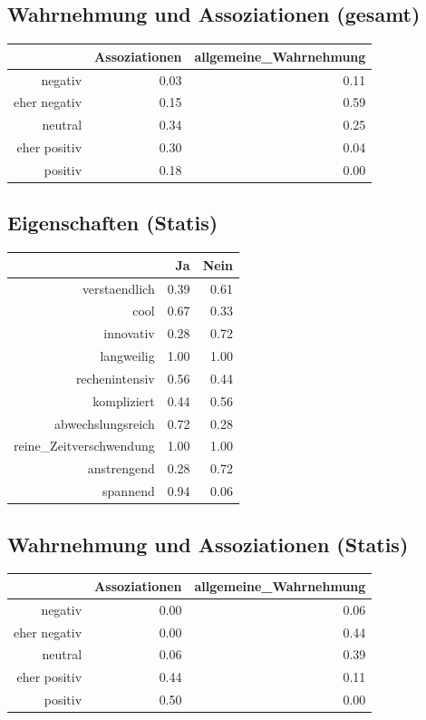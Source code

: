 \documentclass[12pt,a4paper,titlepage=true,parskip,ngerman]{scrartcl}
\begin{document}
\subsection{Wahrnehmung und Assoziationen (gesamt)}
\begin{table}[ht]
\begin{tabular}{rrr}
  \hline
 & Assoziationen & allgemeine\_Wahrnehmung \\ 
  \hline
negativ & 0.03 & 0.11 \\ 
  eher negativ & 0.15 & 0.59 \\ 
  neutral & 0.34 & 0.25 \\ 
  eher positiv & 0.30 & 0.04 \\ 
  positiv & 0.18 & 0.00 \\ 
   \hline
\end{tabular}
\end{table}
\newpage

\subsection{Eigenschaften (Statis)}
\begin{table}[ht]
\begin{tabular}{rrr}
  \hline
 & Ja & Nein \\ 
  \hline
verstaendlich & 0.39 & 0.61 \\ 
  cool & 0.67 & 0.33 \\ 
  innovativ & 0.28 & 0.72 \\ 
  langweilig & 1.00 & 1.00 \\ 
  rechenintensiv & 0.56 & 0.44 \\ 
  kompliziert & 0.44 & 0.56 \\ 
  abwechslungsreich & 0.72 & 0.28 \\ 
  reine\_Zeitverschwendung & 1.00 & 1.00 \\ 
  anstrengend & 0.28 & 0.72 \\ 
  spannend & 0.94 & 0.06 \\ 
   \hline
\end{tabular}
\end{table}

\subsection{Wahrnehmung und Assoziationen (Statis)}
\begin{table}[ht]
\begin{tabular}{rrr}
  \hline
 & Assoziationen & allgemeine\_Wahrnehmung \\ 
  \hline
negativ & 0.00 & 0.06 \\ 
  eher negativ & 0.00 & 0.44 \\ 
  neutral & 0.06 & 0.39 \\ 
  eher positiv & 0.44 & 0.11 \\ 
  positiv & 0.50 & 0.00 \\ 
   \hline
\end{tabular}
\end{table}
\end{document}
